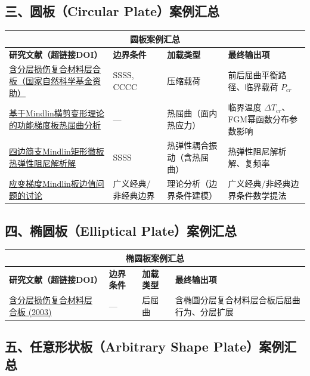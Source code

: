 \documentclass[12pt,a4paper]{article}
\begin{document}
\subsection*{三、圆板（Circular Plate）案例汇总}

{\small
\setlength{\tabcolsep}{3.5pt}
\begin{longtable}{|p{5.2cm}|p{1.8cm}|p{2.0cm}|p{5.2cm}|}
\hline
\multicolumn{4}{|c|}{圆板案例汇总} \\
\hline
\textbf{研究文献（超链接DOI）} & \textbf{边界条件} & \textbf{加载类型} & \textbf{最终输出项} \\
\hline
\endhead
\href{https://www.cnki.net/}{含分层损伤复合材料层合板（国家自然科学基金资助）} & SSSS, CCCC & 压缩载荷 & 前后屈曲平衡路径、临界载荷 $P_{cr}$ \\
\hline
\href{https://www.cnki.net/}{基于Mindlin横剪变形理论的功能梯度板热屈曲分析} & --- & 热屈曲（面内热应力） & 临界温度 $\Delta T_{cr}$、FGM幂函数分布参数影响 \\
\hline
\href{https://www.cnki.net/}{四边简支Mindlin矩形微板热弹性阻尼解析解} & SSSS & 热弹性耦合振动（含热屈曲） & 热弹性阻尼解析解、复频率 \\
\hline
\href{https://www.cnki.net/}{应变梯度Mindlin板边值问题的讨论} & 广义经典/非经典边界 & 理论分析（边界条件建模） & 广义经典/非经典边界条件数学提法 \\
\hline
\bottomrule
\end{longtable}
}

\subsection*{四、椭圆板（Elliptical Plate）案例汇总}

{\small
\setlength{\tabcolsep}{3.5pt}
\begin{longtable}{|p{5.2cm}|p{1.8cm}|p{2.0cm}|p{5.2cm}|}
\hline
\multicolumn{4}{|c|}{椭圆板案例汇总} \\
\hline
\textbf{研究文献（超链接DOI）} & \textbf{边界条件} & \textbf{加载类型} & \textbf{最终输出项} \\
\hline
\endhead
\href{https://www.cnki.net/}{含分层损伤复合材料层合板 (2003)} & --- & 后屈曲 & 含椭圆分层复合材料层合板后屈曲行为、分层扩展 \\
\hline
\bottomrule
\end{longtable}
}

\subsection*{五、任意形状板（Arbitrary Shape Plate）案例汇总}
\end{document}
